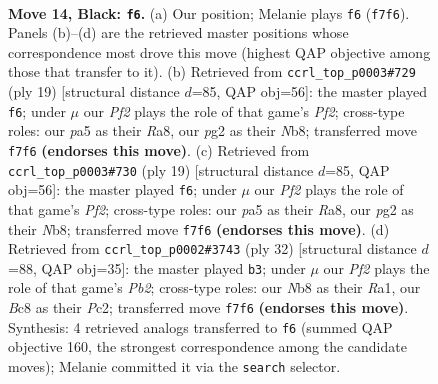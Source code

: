 \documentclass[11pt]{article}
\begin{document}
\clearpage

\begin{figure}[p]\centering
\begin{subfigure}{0.46\textwidth}\centering
\resizebox{\linewidth}{!}{%
\newchessgame
\chessboard[
  setfen={rnbr2k1/pppnppbp/8/P3P2R/2P5/1B3N2/1P3PP1/RNB1K3 b Q - 0 14},
  showmover=false,
  pgfstyle=straightmove, color=movearrow, markmove={f7-f6}
]}
\caption{}
\end{subfigure}\hfill
\begin{subfigure}{0.46\textwidth}\centering
\resizebox{\linewidth}{!}{%
\newchessgame
\chessboard[
  setfen={rnb1kb1r/p4pp1/1pp5/4p2p/2N1P1nP/6P1/PPP2P2/RNB1KB1R b kq - 1 10},
  showmover=false,
  pgfstyle=straightmove, color=movearrow, markmove={f7-f6}
]}
\caption{}
\end{subfigure}
\\[4pt]
\begin{subfigure}{0.46\textwidth}\centering
\resizebox{\linewidth}{!}{%
\newchessgame
\chessboard[
  setfen={rnb1kb1r/p4pp1/1pp5/4p2p/2N1P1nP/6P1/PPP2P2/RNB1KB1R b kq - 1 10},
  showmover=false,
  pgfstyle=straightmove, color=movearrow, markmove={f7-f6}
]}
\caption{}
\end{subfigure}\hfill
\begin{subfigure}{0.46\textwidth}\centering
\resizebox{\linewidth}{!}{%
\newchessgame
\chessboard[
  setfen={2k1rbnr/1pp2bp1/p1p4p/4p3/4P1PN/5N1P/PPP2P2/R1B1R1K1 w - - 4 17},
  showmover=false,
  pgfstyle=straightmove, color=movearrow, markmove={b2-b3}
]}
\caption{}
\end{subfigure}
\caption{\textbf{Move 14, Black: \texttt{f6}.} (a) Our position; Melanie plays \texttt{f6} (\texttt{f7f6}). Panels (b)--(d) are the retrieved master positions whose correspondence most drove this move (highest QAP objective among those that transfer to it). (b) Retrieved from \texttt{ccrl\_top\_p0003\#729} (ply 19) [structural distance $d$=85, QAP obj=56]: the master played \texttt{f6}; under $\mu$ our \emph{Pf2} plays the role of that game's \emph{Pf2}; cross-type roles: our \emph{p}a5 as their \emph{R}a8, our \emph{p}g2 as their \emph{N}b8; transferred move \texttt{f7f6} \textbf{(endorses this move)}. (c) Retrieved from \texttt{ccrl\_top\_p0003\#730} (ply 19) [structural distance $d$=85, QAP obj=56]: the master played \texttt{f6}; under $\mu$ our \emph{Pf2} plays the role of that game's \emph{Pf2}; cross-type roles: our \emph{p}a5 as their \emph{R}a8, our \emph{p}g2 as their \emph{N}b8; transferred move \texttt{f7f6} \textbf{(endorses this move)}. (d) Retrieved from \texttt{ccrl\_top\_p0002\#3743} (ply 32) [structural distance $d$=88, QAP obj=35]: the master played \texttt{b3}; under $\mu$ our \emph{Pf2} plays the role of that game's \emph{Pb2}; cross-type roles: our \emph{N}b8 as their \emph{R}a1, our \emph{B}c8 as their \emph{P}c2; transferred move \texttt{f7f6} \textbf{(endorses this move)}. Synthesis: 4 retrieved analogs transferred to \texttt{f6} (summed QAP objective 160, the strongest correspondence among the candidate moves); Melanie committed it via the \texttt{search} selector.}
\label{fig:thought-m27}
\end{figure}
\end{document}
